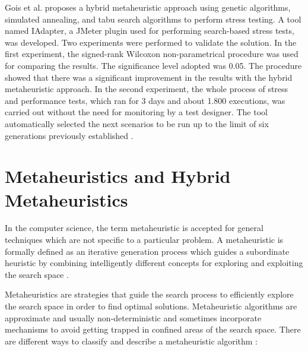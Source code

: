 \documentclass{bmcart}
\begin{document}
Gois et al. proposes a hybrid metaheuristic approach using genetic algorithms, simulated annealing, and tabu search algorithms to perform stress testing. A tool named IAdapter, a JMeter plugin used for performing search-based stress tests, was developed. Two experiments were performed to validate the solution. In the first experiment, the signed-rank Wilcoxon non-parametrical procedure was used for comparing the results. The significance level adopted was 0.05. The procedure showed that there was a significant improvement in the results with the hybrid metaheuristic approach.
In the second experiment, the whole process of stress and performance tests, which ran for 3 days and about 1.800 executions, was carried out without the need for monitoring by a test designer. The tool automatically selected the next scenarios to be run up to the limit of six generations previously established \citep{Gois2016}. 


\section{Metaheuristics and Hybrid Metaheuristics}

In the computer science, the term metaheuristic is accepted for general techniques which are not specific to a particular problem. A metaheuristic is formally defined as an iterative generation process which guides a subordinate heuristic by combining intelligently different concepts for exploring and exploiting the search space \citep{raidl2010metaheuristic}. 

Metaheuristics are strategies that guide the search process to efficiently explore the search space in order to find optimal solutions. Metaheuristic algorithms are approximate and usually non-deterministic and sometimes incorporate mechanisms to avoid getting trapped in confined areas of the search space. There are different ways to classify and describe a metaheuristic algorithm \citep{Blum2003}:
\end{document}
